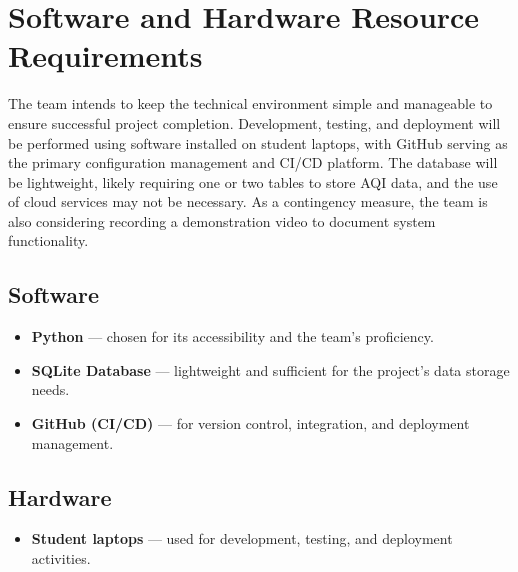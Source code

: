 \section{Software and Hardware Resource Requirements}

The team intends to keep the technical environment simple and manageable to ensure successful project completion. Development, testing, and deployment will be performed using software installed on student laptops, with GitHub serving as the primary configuration management and CI/CD platform. The database will be lightweight, likely requiring one or two tables to store AQI data, and the use of cloud services may not be necessary. As a contingency measure, the team is also considering recording a demonstration video to document system functionality.

\subsection*{Software}
\begin{itemize}
    \item \textbf{Python} --- chosen for its accessibility and the team’s proficiency.
    \item \textbf{SQLite Database} --- lightweight and sufficient for the project’s data storage needs.
    \item \textbf{GitHub (CI/CD)} --- for version control, integration, and deployment management.
\end{itemize}

\subsection*{Hardware}
\begin{itemize}
    \item \textbf{Student laptops} --- used for development, testing, and deployment activities.
\end{itemize}
